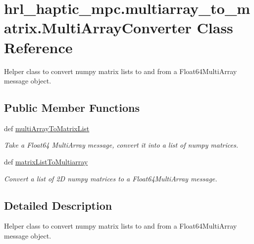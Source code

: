 \hypertarget{classhrl__haptic__mpc_1_1multiarray__to__matrix_1_1_multi_array_converter}{\section{hrl\-\_\-haptic\-\_\-mpc.\-multiarray\-\_\-to\-\_\-matrix.\-Multi\-Array\-Converter \-Class \-Reference}
\label{classhrl__haptic__mpc_1_1multiarray__to__matrix_1_1_multi_array_converter}
}


\-Helper class to convert numpy matrix lists to and from a \-Float64\-Multi\-Array message object.  


\subsection*{\-Public \-Member \-Functions}
\begin{DoxyCompactItemize}
\item 
\hypertarget{classhrl__haptic__mpc_1_1multiarray__to__matrix_1_1_multi_array_converter_af475bde4b97f9f985a4b7b4c2d0d601b}{def \hyperlink{classhrl__haptic__mpc_1_1multiarray__to__matrix_1_1_multi_array_converter_af475bde4b97f9f985a4b7b4c2d0d601b}{multi\-Array\-To\-Matrix\-List}}\label{classhrl__haptic__mpc_1_1multiarray__to__matrix_1_1_multi_array_converter_af475bde4b97f9f985a4b7b4c2d0d601b}

\begin{DoxyCompactList}\small\item\em \-Take a \-Float64 \-Multi\-Array message, convert it into a list of numpy matrices. \end{DoxyCompactList}\item 
def \hyperlink{classhrl__haptic__mpc_1_1multiarray__to__matrix_1_1_multi_array_converter_a1990459a0f7ca75acb65e3084dc50f5a}{matrix\-List\-To\-Multiarray}
\begin{DoxyCompactList}\small\item\em \-Convert a list of 2\-D numpy matrices to a \-Float64\-Multi\-Array message. \end{DoxyCompactList}\end{DoxyCompactItemize}


\subsection{\-Detailed \-Description}
\-Helper class to convert numpy matrix lists to and from a \-Float64\-Multi\-Array message object. 



